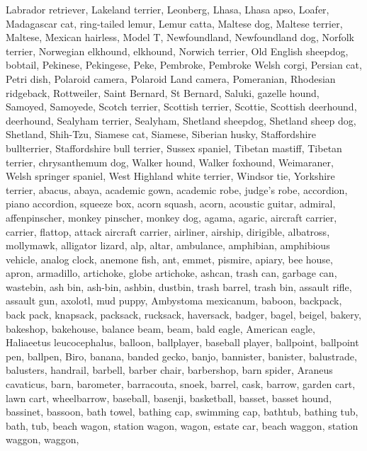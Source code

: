 \documentclass{article}
\begin{document}
{{Labrador retriever},
{Lakeland terrier},
{Leonberg},
{Lhasa, Lhasa apso},
{Loafer},
{Madagascar cat, ring-tailed lemur, Lemur catta},
{Maltese dog, Maltese terrier, Maltese},
{Mexican hairless},
{Model T},
{Newfoundland, Newfoundland dog},
{Norfolk terrier},
{Norwegian elkhound, elkhound},
{Norwich terrier},
{Old English sheepdog, bobtail},
{Pekinese, Pekingese, Peke},
{Pembroke, Pembroke Welsh corgi},
{Persian cat},
{Petri dish},
{Polaroid camera, Polaroid Land camera},
{Pomeranian},
{Rhodesian ridgeback},
{Rottweiler},
{Saint Bernard, St Bernard},
{Saluki, gazelle hound},
{Samoyed, Samoyede},
{Scotch terrier, Scottish terrier, Scottie},
{Scottish deerhound, deerhound},
{Sealyham terrier, Sealyham},
{Shetland sheepdog, Shetland sheep dog, Shetland},
{Shih-Tzu},
{Siamese cat, Siamese},
{Siberian husky},
{Staffordshire bullterrier, Staffordshire bull terrier},
{Sussex spaniel},
{Tibetan mastiff},
{Tibetan terrier, chrysanthemum dog},
{Walker hound, Walker foxhound},
{Weimaraner},
{Welsh springer spaniel},
{West Highland white terrier},
{Windsor tie},
{Yorkshire terrier},
{abacus},
{abaya},
{academic gown, academic robe, judge's robe},
{accordion, piano accordion, squeeze box},
{acorn squash},
{acorn},
{acoustic guitar},
{admiral},
{affenpinscher, monkey pinscher, monkey dog},
{agama},
{agaric},
{aircraft carrier, carrier, flattop, attack aircraft carrier},
{airliner},
{airship, dirigible},
{albatross, mollymawk},
{alligator lizard},
{alp},
{altar},
{ambulance},
{amphibian, amphibious vehicle},
{analog clock},
{anemone fish},
{ant, emmet, pismire},
{apiary, bee house},
{apron},
{armadillo},
{artichoke, globe artichoke},
{ashcan, trash can, garbage can, wastebin, ash bin, ash-bin, ashbin, dustbin, trash barrel, trash bin},
{assault rifle, assault gun},
{axolotl, mud puppy, Ambystoma mexicanum},
{baboon},
{backpack, back pack, knapsack, packsack, rucksack, haversack},
{badger},
{bagel, beigel},
{bakery, bakeshop, bakehouse},
{balance beam, beam},
{bald eagle, American eagle, Haliaeetus leucocephalus},
{balloon},
{ballplayer, baseball player},
{ballpoint, ballpoint pen, ballpen, Biro},
{banana},
{banded gecko},
{banjo},
{bannister, banister, balustrade, balusters, handrail},
{barbell},
{barber chair},
{barbershop},
{barn spider, Araneus cavaticus},
{barn},
{barometer},
{barracouta, snoek},
{barrel, cask},
{barrow, garden cart, lawn cart, wheelbarrow},
{baseball},
{basenji},
{basketball},
{basset, basset hound},
{bassinet},
{bassoon},
{bath towel},
{bathing cap, swimming cap},
{bathtub, bathing tub, bath, tub},
{beach wagon, station wagon, wagon, estate car, beach waggon, station waggon, waggon},
}
\end{document}
